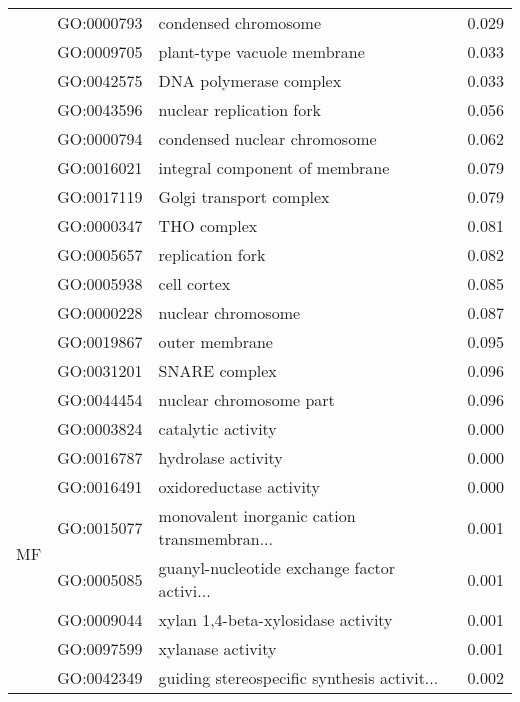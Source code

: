 \begin{longtable}{lllr}
   & GO:0000793 &                         condensed chromosome &         0.029 \\
   & GO:0009705 &                  plant-type vacuole membrane &         0.033 \\
   & GO:0042575 &                       DNA polymerase complex &         0.033 \\
   & GO:0043596 &                     nuclear replication fork &         0.056 \\
   & GO:0000794 &                 condensed nuclear chromosome &         0.062 \\
   & GO:0016021 &               integral component of membrane &         0.079 \\
   & GO:0017119 &                      Golgi transport complex &         0.079 \\
   & GO:0000347 &                                  THO complex &         0.081 \\
   & GO:0005657 &                             replication fork &         0.082 \\
   & GO:0005938 &                                  cell cortex &         0.085 \\
   & GO:0000228 &                           nuclear chromosome &         0.087 \\
   & GO:0019867 &                               outer membrane &         0.095 \\
   & GO:0031201 &                                SNARE complex &         0.096 \\
   & GO:0044454 &                      nuclear chromosome part &         0.096 \\
\cline{1-4}
\multirow{111}{*}{MF} & GO:0003824 &                           catalytic activity &         0.000 \\
   & GO:0016787 &                           hydrolase activity &         0.000 \\
   & GO:0016491 &                      oxidoreductase activity &         0.000 \\
   & GO:0015077 &  monovalent inorganic cation transmembran... &         0.001 \\
   & GO:0005085 &  guanyl-nucleotide exchange factor activi... &         0.001 \\
   & GO:0009044 &           xylan 1,4-beta-xylosidase activity &         0.001 \\
   & GO:0097599 &                            xylanase activity &         0.001 \\
   & GO:0042349 &  guiding stereospecific synthesis activit... &         0.002 \\

\end{longtable}
